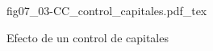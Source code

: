 \begin{figure}[h]
\centering
\def\svgwidth{0.5\textwidth}
{fig07_03-CC_control_capitales.pdf_tex}
\caption{Efecto de un control de capitales}
\label{fig07_03-CC_control_capitales}
\end{figure}
